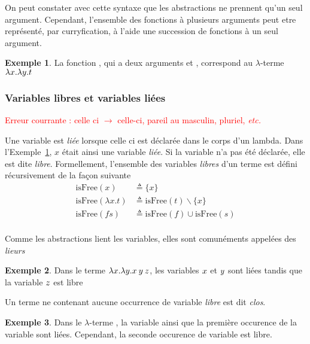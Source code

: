 \documentclass {article}
\theoremstyle{definition}
\newtheorem{example}{Exemple}
\theoremstyle{remark}
\newcommand{\todo}[1]{\textcolor{red}{#1}}
\newcommand{\etc}{\textit{etc.}}
\begin{document}
On peut constater avec cette syntaxe que les abstractions ne prennent
qu'un seul argument. Cependant, l'ensemble des fonctions à plusieurs
arguments peut etre représenté, par curryfication, à l'aide une
succession de fonctions à un seul argument.

\begin{example}
  \label{example:id}
  La fonction , qui a deux arguments  et ,
  correspond au $\lambda$-terme $\lambda x. \lambda y. t$
\end{example} 


\subsubsection{Variables libres et variables liées}

\newcommand{\IsFree}{\mathrm{isFree}}

\todo{Erreur courrante : celle ci $\to$ celle-ci, pareil au masculin, pluriel, \etc}

Une variable est \emph{liée} lorsque celle ci est déclarée dans le corps d'un
lambda. Dans l'Exemple~\ref{example:id}, $x$ était ainsi une variable \emph{liée}.
Si la variable n'a pas été déclarée, elle est dite
\emph{libre}. Formellement, l'ensemble des variables \emph{libres} d'un terme est
défini récursivement de la façon suivante
%
\begin{align*}
  \IsFree(x) &\triangleq \{x\} \\
  \IsFree(\lambda x. t) &\triangleq \IsFree(t) \backslash \{x\} \\
  \IsFree(f s) &\triangleq \IsFree(f) \cup \IsFree(s) \\
\end{align*}

Comme les abstractions lient les variables, elles sont comunéments appelées des \emph{lieurs}

\begin{example}
  Dans le terme \(\lambda x. \lambda y. x\:y\:z\), 
  les variables $x$ et $y$ sont liées tandis que la variable $z$ est libre 
\end{example}


Un terme ne contenant aucune occurrence de variable \emph{libre} est dit \emph{clos}.

\begin{example}  
  \label{example:ouvert-clos}  
  Dans le $\lambda$-terme
  , la variable 
  ainsi que la première occurence de la variable  sont
  liées. Cependant, la seconde occurence de variable  est
  libre.
\end{example}
\end{document}
